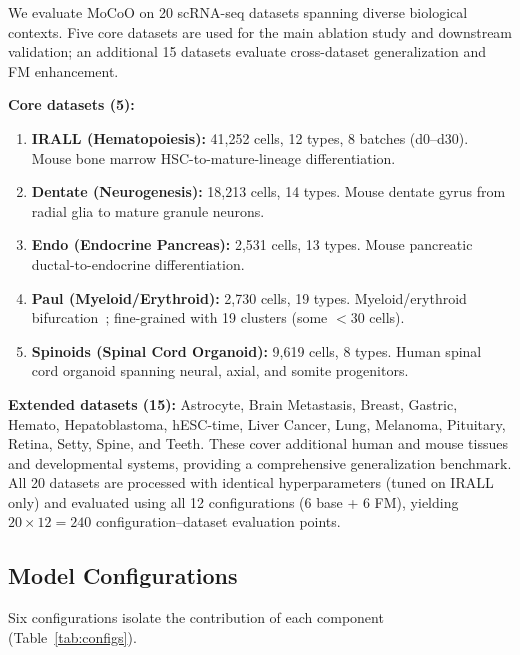 \documentclass[preprint,12pt,number]{elsarticle}
\begin{document}
We evaluate MoCoO on 20 scRNA-seq datasets spanning diverse biological contexts. Five core datasets are used for the main ablation study and downstream validation; an additional 15 datasets evaluate cross-dataset generalization and FM enhancement.

\textbf{Core datasets (5):}
\begin{enumerate}
    \item \textbf{IRALL (Hematopoiesis):} 41{,}252 cells, 12 types, 8 batches (d0--d30). Mouse bone marrow HSC-to-mature-lineage differentiation.
    \item \textbf{Dentate (Neurogenesis):} 18{,}213 cells, 14 types. Mouse dentate gyrus from radial glia to mature granule neurons.
    \item \textbf{Endo (Endocrine Pancreas):} 2{,}531 cells, 13 types. Mouse pancreatic ductal-to-endocrine differentiation.
    \item \textbf{Paul (Myeloid/Erythroid):} 2{,}730 cells, 19 types. Myeloid/erythroid bifurcation~\cite{paul2015transcriptional}; fine-grained with 19 clusters (some $< 30$ cells).
    \item \textbf{Spinoids (Spinal Cord Organoid):} 9{,}619 cells, 8 types. Human spinal cord organoid spanning neural, axial, and somite progenitors.
\end{enumerate}

\textbf{Extended datasets (15):} Astrocyte, Brain Metastasis, Breast, Gastric, Hemato, Hepatoblastoma, hESC-time, Liver Cancer, Lung, Melanoma, Pituitary, Retina, Setty, Spine, and Teeth. These cover additional human and mouse tissues and developmental systems, providing a comprehensive generalization benchmark. All 20 datasets are processed with identical hyperparameters (tuned on IRALL only) and evaluated using all 12 configurations (6 base + 6 FM), yielding $20 \times 12 = 240$ configuration--dataset evaluation points.

\subsection{Model Configurations}
\label{sec:experiments:configs}

Six configurations isolate the contribution of each component (Table~\ref{tab:configs}).
\end{document}
